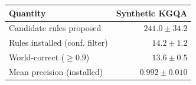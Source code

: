 \begin{tabular}{lr}
\toprule
Quantity & Synthetic KGQA \\
\midrule
Candidate rules proposed & $241.0 \pm 34.2$ \\
Rules installed (conf. filter) & $14.2 \pm 1.2$ \\
World-correct ($\ge 0.9$) & $13.6 \pm 0.5$ \\
Mean precision (installed) & $0.992 \pm 0.010$ \\
\bottomrule
\end{tabular}
